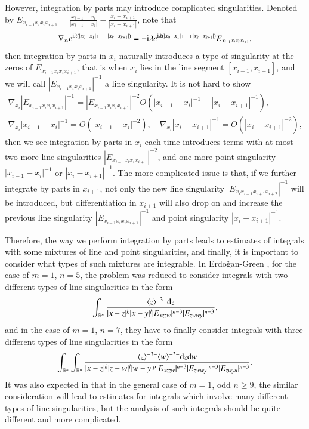 \documentclass[11pt,reqno]{amsart}
\def\d{{\rm d}}
\def\i{{\rm i}}
\numberwithin{equation}{section}
\theoremstyle{definition}
\begin{document}
However, integration by parts may introduce complicated singularities. Denoted by $E_{x_{i-1}x_{i}x_ix_{i+1}}=\frac{x_{i-1}-x_i}{|x_{i-1}-x_i|}-\frac{x_i-x_{i+1}}{|x_i-x_{i+1}|}$, note that
\begin{equation}
	\nabla_{x_i}e^{\mathrm{i}\lambda (|x_0-x_1|+\cdots+|x_k-x_{k+1}|)}=-\i\lambda e^{\mathrm{i}\lambda (|x_0-x_1|+\cdots+|x_k-x_{k+1}|)}E_{x_{i-1}x_{i}x_ix_{i+1}},
\end{equation}
then integration by parts in $x_i$ naturally introduces a type of singularity at the zeros of $E_{x_{i-1}x_{i}x_ix_{i+1}}$, that is when $x_i$ lies in the line segment $[x_{i-1},x_{i+1}]$, and we will call $|E_{x_{i-1}x_{i}x_ix_{i+1}}|^{-1}$ a line singularity. It is not hard to show 
\begin{equation}
	\begin{split}
		\nabla_{x_i}|E_{x_{i-1}x_{i}x_ix_{i+1}}|^{-1}=|E_{x_{i-1}x_{i}x_ix_{i+1}}|^{-2}O\left(|x_{i-1}-x_i|^{-1}+|x_i-x_{i+1}|^{-1}\right),\\
		\nabla_{x_i}|x_{i-1}-x_i|^{-1}=O\left(|x_{i-1}-x_i|^{-2}\right),\quad \nabla_{x_i}|x_{i}-x_{i+1}|^{-1}=O\left(|x_{i}-x_{i+1}|^{-2}\right),
	\end{split}
\end{equation}
then we see integration by parts in $x_i$ each time introduces terms with at most two more line singularities $|E_{x_{i-1}x_{i}x_ix_{i+1}}|^{-2}$, and one more point singularity $|x_{i-1}-x_i|^{-1}$ or $|x_{i}-x_{i+1}|^{-1}$. The more complicated issue is that, if we further integrate by parts in $x_{i+1}$, not only the new line singularity $|E_{x_{i}x_{i+1}x_{i+1}x_{i+2}}|^{-1}$ will be introduced, but differentiation in $x_{i+1}$ will also drop on and increase the previous line singularity $|E_{x_{i-1}x_{i}x_ix_{i+1}}|^{-1}$ and point singularity $|x_{i}-x_{i+1}|^{-1}$. 

Therefore, the way we perform integration by parts leads to estimates of integrals with some mixtures of line and point singularities, and finally, it is important to consider what types of such mixtures are integrable. In Erdo\v{g}an-Green \cite{EG10}, for the case of $m=1$, $n=5$, the problem was reduced to consider integrals with two different types of line singularities in the form
\begin{equation*}
	\int_{\mathbb{R}^n}\frac{\langle z\rangle^{-3-}\d z}{|x-z|^k|x-y|^l|E_{xzzw}|^{n-3}|E_{zwwy}|^{n-3}},
\end{equation*}
and in the case of $m=1$, $n=7$, they have to finally consider integrals with three different types of line singularities in the form
\begin{equation*}
	\int_{\mathbb{R}^n}\int_{\mathbb{R}^n}\frac{\langle z\rangle^{-3-}\langle w\rangle^{-3-}\d z\d w}{|x-z|^k|z-w|^l|w-y|^p|E_{xzzw}|^{n-3}|E_{zwwy}|^{n-3}|E_{zwyu}|^{n-3}}.
\end{equation*}
It was also expected in \cite{EG10} that in the general case of $m=1$, odd $n\geq9$, the similar consideration will lead to estimates for integrals which involve many different types of line singularities, but the analysis of such integrals should be quite different and more complicated.
\end{document}

